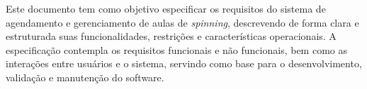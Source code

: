 

Este documento tem como objetivo especificar os requisitos do sistema de agendamento e gerenciamento de aulas de \textit{spinning}, descrevendo de forma clara e estruturada suas funcionalidades, restrições e características operacionais. A especificação contempla os requisitos funcionais e não funcionais, bem como as interações entre usuários e o sistema, servindo como base para o desenvolvimento, validação e manutenção do software.